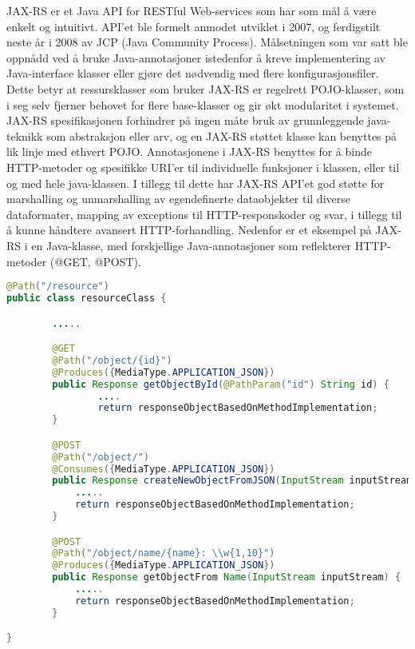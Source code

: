 \documentclass[../main.tex]{subfiles}
\begin{document}
JAX-RS er et Java API for RESTful Web-services som har som mål å være enkelt og intuitivt.  API’et ble formelt anmodet utviklet i 2007, og ferdigstilt neste år i 2008 av JCP (Java Community Process). Målsetningen som var satt ble oppnådd ved å bruke Java-annotasjoner istedenfor å kreve implementering av Java-interface klasser eller gjøre det nødvendig med flere konfigurasjonsfiler. Dette betyr at ressursklasser som bruker JAX-RS er regelrett POJO-klasser, som i seg selv fjerner behovet for flere base-klasser og gir økt modularitet i systemet. JAX-RS spesifikasjonen forhindrer på ingen måte bruk av grunnleggende java-teknikk som abstraksjon eller arv, og en JAX-RS støttet klasse kan benyttes på lik linje med ethvert POJO.\newline
\newline
Annotasjonene i JAX-RS benyttes for å binde HTTP-metoder og spesifikke URI’er til individuelle funksjoner i klassen, eller til og med hele java-klassen. I tillegg til dette har JAX-RS API’et god støtte for marshalling og unmarshalling av egendefinerte dataobjekter til diverse dataformater, mapping av exceptions til HTTP-responskoder og svar, i tillegg til å kunne håndtere avansert HTTP-forhandling.
Nedenfor er et eksempel på JAX-RS i en Java-klasse, med forskjellige Java-annotasjoner som reflekterer HTTP-metoder (@GET, @POST).

\begin{lstlisting}[language=Java, frame=single, caption={(SDSADASDASDSADASDADSA)}]
@Path("/resource")
public class resourceClass {

        .....

        @GET
        @Path("/object/{id}")
        @Produces({MediaType.APPLICATION_JSON})
        public Response getObjectById(@PathParam("id") String id) {
                ....
                return responseObjectBasedOnMethodImplementation;
        }

        @POST
        @Path("/object/")
        @Consumes({MediaType.APPLICATION_JSON})
        public Response createNewObjectFromJSON(InputStream inputStream) {
            .....
            return responseObjectBasedOnMethodImplementation;
        }

        @POST
        @Path("/object/name/{name}: \\w{1,10}")
        @Produces({MediaType.APPLICATION_JSON})
        public Response getObjectFrom Name(InputStream inputStream) {
            .....
            return responseObjectBasedOnMethodImplementation;
        }

}
\end{lstlisting}
\end{document}
